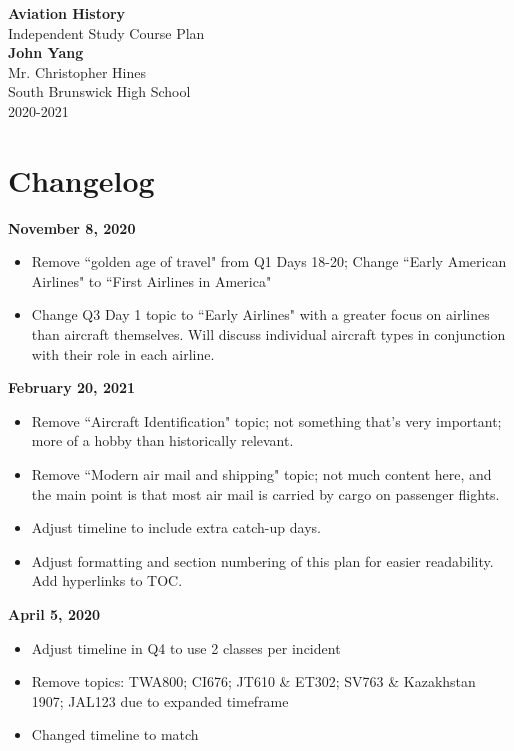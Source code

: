\documentclass[12pt]{article}
\begin{document}
	\begin{titlepage}
		\begin{center}
			\vspace*{1cm}
			\Huge
				\textbf{Aviation History}\\
			\vspace{0.5cm}
			\LARGE
				Independent Study Course Plan\\
			\vspace{1.5cm}
				\textbf{John Yang}\\
			\vfill
			\vspace{0.8cm}
			\Large
				Mr. Christopher Hines\\
				South Brunswick High School\\
				2020-2021
		\end{center}
	\end{titlepage}\newpage

\section{Changelog}
\textbf{November 8, 2020}
\begin{itemize}
    \item Remove ``golden age of travel" from Q1 Days 18-20; Change ``Early American Airlines"
    to ``First Airlines in America"
    \item Change Q3 Day 1 topic to ``Early Airlines" with a greater focus on airlines than aircraft
    themselves. Will discuss individual aircraft types in conjunction with their role in each
    airline.
\end{itemize}
\textbf{February 20, 2021}
\begin{itemize}
    \item Remove ``Aircraft Identification" topic; not something that's very important; more of a hobby than historically relevant. 
    \item Remove ``Modern air mail and shipping" topic; not much content here, and the main point is that most air mail is carried by cargo on passenger flights. 
    \item Adjust timeline to include extra catch-up days. 
    \item Adjust formatting and section numbering of this plan for easier readability. Add hyperlinks to TOC. 
\end{itemize}
\textbf{April 5, 2020}
\begin{itemize}
    \item Adjust timeline in Q4 to use 2 classes per incident
    \item Remove topics: TWA800; CI676; JT610 \& ET302; SV763 \& Kazakhstan 1907; JAL123 due to expanded timeframe
    \item Changed timeline to match
\end{itemize}
\end{document}

